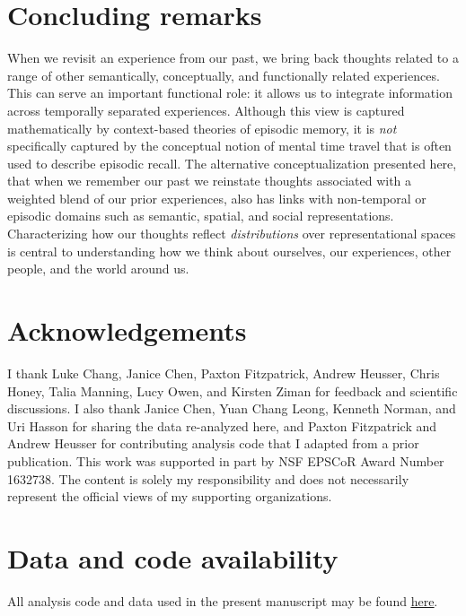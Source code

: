 \documentclass{article}
\begin{document}
\section*{Concluding remarks}
When we revisit an experience from our past, we bring back thoughts related to a range of other semantically, conceptually, and functionally related experiences.  This can serve an important functional role: it allows us to integrate information across temporally separated experiences.  Although this view is captured mathematically by context-based theories of episodic memory, it is \textit{not} specifically captured by the conceptual notion of mental time travel that is often used to describe episodic recall.  The alternative conceptualization presented here, that when we remember our past we reinstate thoughts associated with a weighted blend of our prior experiences, also has links with non-temporal or episodic domains such as semantic, spatial, and social representations.  Characterizing how our thoughts reflect \textit{distributions} over representational spaces is central to understanding how we think about ourselves, our experiences, other people, and the world around us.

\section*{Acknowledgements}
I thank Luke Chang, Janice Chen, Paxton Fitzpatrick, Andrew Heusser, Chris Honey, Talia Manning, Lucy Owen, and Kirsten Ziman for feedback and scientific discussions. I also thank Janice Chen, Yuan Chang Leong, Kenneth Norman, and Uri Hasson for sharing the data re-analyzed here, and Paxton Fitzpatrick and Andrew Heusser for contributing analysis code that I adapted from a prior publication.  This work was supported in part by NSF EPSCoR Award Number 1632738. The content is solely my responsibility and does not necessarily represent the official views of my supporting organizations.

\section*{Data and code availability}
All analysis code and data used in the present manuscript may be found \href{https://github.com/ContextLab/mental-time-travel-paper}{\underline{here}}.



\end{document}
